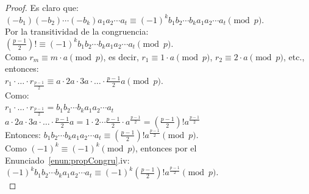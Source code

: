\begin{proof}
Es claro que: \\
$(-b_{1})(-b_{2})\cdots(-b_{k})a_{1}a_{2}\cdots a_{t} \equiv (-1)^kb_{1}b_{2}\cdots b_{k}a_{1}a_{2}\cdots a_{t} \pmod{p}$. \\
Por la transitividad de la congruencia: \\
$\left(\frac{p-1}{2}\right)! \equiv (-1)^kb_{1}b_{2}\cdots b_{k}a_{1}a_{2}\cdots a_{t} \pmod{p}$. \\ 
Como $r_m \equiv m \cdot a \pmod p$, es decir, $r_1 \equiv 1 \cdot a \pmod p$, $r_2 \equiv 2 \cdot a \pmod p$, etc., entonces: \\
$r_1 \cdot \ldots \cdot r_{\frac{p-1}{2}} \equiv a \cdot 2a \cdot 3a \cdot \ldots \cdot \frac{p-1}{2}a \pmod{p}$. \\
Como: \\
$r_1 \cdot \ldots \cdot r_{\frac{p-1}{2}} = b_{1}b_{2}\cdots b_{k}a_{1}a_{2}\cdots a_{t}$ \\
$a \cdot 2a \cdot 3a \cdot \ldots \cdot \frac{p-1}{2}a = 1 \cdot 2 \cdots \frac{p-1}{2} \cdot a^{\frac{p-1}{2}} = \left(\frac{p-1}{2}\right)! a^{\frac{p-1}{2}}$ \\
Entonces:
$b_{1}b_{2}\cdots b_{k}a_{1}a_{2}\cdots a_{t} \equiv \left(\frac{p-1}{2}\right)! a^{\frac{p-1}{2}} \pmod p$. \\
Como $(-1)^k \equiv (-1)^k \pmod p$, entonces por el  Enunciado~\ref{enun:propCongru}.iv: \\
$(-1)^kb_{1}b_{2}\cdots b_{k}a_{1}a_{2}\cdots a_{t} \equiv (-1)^k \left(\frac{p-1}{2}\right)! a^{\frac{p-1}{2}} \pmod p$. \\


\end{proof}
